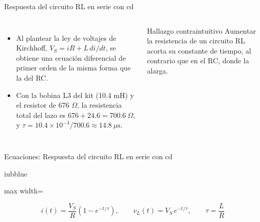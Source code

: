 \documentclass[aspectratio=169,11pt,xcolor={table}]{beamer}
\begin{document}
\begin{frame}{Respuesta del circuito RL en serie con cd}
\begin{columns}[c,onlytextwidth]
\small
\begin{itemize}\setlength{\itemsep}{4pt}
  \item Al plantear la ley de voltajes de Kirchhoff, $V_S = iR + L\,di/dt$, se obtiene una ecuación diferencial de primer orden de la misma forma que la del RC.
  \item Con la bobina L3 del kit (10.4 mH) y el resistor de 676 \ensuremath{\Omega}, la resistencia total del lazo es $676 + 24.6 = 700.6\ \Omega$, y $\tau = 10.4 \times 10^{-3}/700.6 \approx 14.8\ \mu\text{s}$.
\end{itemize}
\begin{cardO}{Hallazgo contraintuitivo}
\footnotesize Aumentar la resistencia de un circuito RL acorta su constante de tiempo, al contrario que en el RC, donde la alarga.
\end{cardO}
\end{columns}
\end{frame}

\begin{frame}{{\normalsize Ecuaciones: Respuesta del circuito RL en serie con cd}}
\begin{cajaplana}{iubblue}
\centering
\begin{adjustbox}{max width=\linewidth}
\begin{minipage}{1.20\linewidth}
{\large
\begin{equation*}
  i(t) = \frac{V_S}{R}\left(1 - e^{-t/\tau}\right), \qquad v_L(t) = V_S\,e^{-t/\tau}, \qquad \tau = \frac{L}{R}
\end{equation*}
}
\end{minipage}
\end{adjustbox}
\end{cajaplana}
\end{frame}
\end{document}
